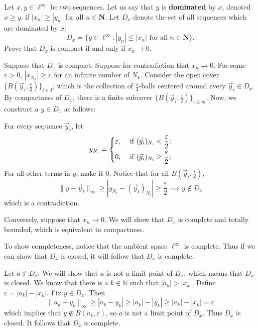 \documentclass{article}
\newcommand{\N}{\mathbf{N}}
\theoremstyle{plain} %
\numberwithin{thm}{section} %
\theoremstyle{definition}
\begin{document}
    \begin{question}{19}
        Let $x,y\in \ell^\infty$ be two sequences. Let us say that $y$ is \textbf{dominated} by $x$, denoted $x\geq y$, if $|x_n|\geq |y_n|$ for all $n\in \N$. Let $D_x$ denote the set of all sequences which are dominated by $x$:
        \[ D_x = \{y\in \ell^\infty: |y_n|\leq |x_n| \text{ for all $n\in \N$}\}. \]
        Prove that $D_x$ is compact if and only if $x_n\rightarrow 0$.

        \tcblower

        Suppose that \(D_x\) is compact. Suppose for contradiction that \(x_n \nrightarrow 0\). For some \(\varepsilon > 0\), \(|x_{N_k}| \geq \varepsilon\) for an infinite number of \(N_k\). Consider the open cover \(\{B(\vec{y}_i, \frac{\varepsilon}{2})\}_{i\in I}\), which is the collection of \(\frac{\varepsilon}{2}\)-balls centered around every \(\vec{y}_i \in D_x\). By compactness of \(D_x\), there is a finite subcover \(\{B(\vec{y}_i, \frac{\varepsilon}{2})\}_{i \leq m}\). Now, we construct a \(y \in D_x\) as follows:

        For every sequence \(\vec{y}_i\), let
        \[
            y_{N_i} = \begin{dcases}
                \varepsilon, &\text{ if } (\vec{y}_i)_{N_i} < \frac{\varepsilon}{2};\\
                0, &\text{ if } (\vec{y}_i)_{N_i} \geq \frac{\varepsilon}{2} ;\\
            \end{dcases}
        \]
        For all other terms in \(y\), make it 0. Notice that for all \(B(\vec{y}_i, \frac{\varepsilon}{2})\),
        \[
            \|y-\vec{y}_i\|_\infty \geq |y_{N_i} - (\vec{y}_i)_{N_i}| \geq \frac{\varepsilon}{2} \implies y \notin D_x
        \]
        which is a contradiction.

        Conversely, suppose that \(x_n \rightarrow 0\). We will show that \(D_x\) is complete and totally bounded, which is equivalent to compactness.

        To show completeness, notice that the ambient space \(\ell ^{\infty}\) is complete. Thus if we can show that \(D_x\) is closed, it will follow that \(D_x\) is complete.

        Let \(a \notin D_x\). We will show that \(a\) is not a limit point of \(D_x\), which means that \(D_x\) is closed. We know that there is a \(k \in \mathbb{N}\) such that \(|a_k| > |x_k|\). Define \(\varepsilon = |a_k| - |x_k|\). Fix \(y \in D_x\). Then
        \[
            \|a_k - y_k\| _{\infty} \geq |a_k - y_k| \geq |a_k| - |y_k| \geq |a_k| - |x_k| = \varepsilon
        \]
        which implies that \(y \notin B(a_k, \varepsilon)\), so \(a\) is not a limit point of \(D_x\). Thus \(D_x\) is closed. It follows that \(D_x\) is complete.


\end{question}
\end{document}

